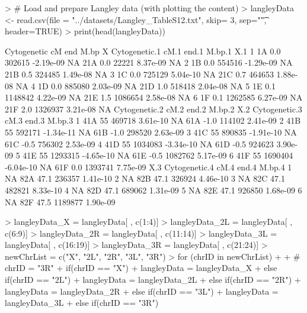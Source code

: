 \documentclass{article}
\begin{document}
\begin{Schunk}
\begin{Sinput}
> # Load and prepare Langley data (with plotting the content)
> langleyData <- read.csv(file = "../datasets/Langley_TableS12.txt", skip= 3, sep="\t", header=TRUE)
>     print(head(langleyData))
\end{Sinput}
\begin{Soutput}
  Cytogenetic  cM     end      M.bp  X Cytogenetic.1 cM.1   end.1   M.bp.1 X.1
1          1A 0.0  302615 -2.19e-09 NA           21A  0.0   22221 8.37e-09  NA
2          1B 0.0  554516 -1.29e-09 NA           21B  0.5  324485 1.49e-08  NA
3          1C 0.0  725129  5.04e-10 NA           21C  0.7  464653 1.88e-08  NA
4          1D 0.0  885080  2.03e-09 NA           21D  1.0  518418 2.04e-08  NA
5          1E 0.1 1148842  4.22e-09 NA           21E  1.5 1086654 2.58e-08  NA
6          1F 0.1 1262585  6.27e-09 NA           21F  2.0 1326937 3.21e-08  NA
  Cytogenetic.2 cM.2   end.2    M.bp.2 X.2 Cytogenetic.3 cM.3   end.3   M.bp.3
1           41A   55  469718  3.61e-10  NA           61A -1.0  114102 2.41e-09
2           41B   55  592171 -1.34e-11  NA           61B -1.0  298520 2.63e-09
3           41C   55  890835 -1.91e-10  NA           61C -0.5  756302 2.53e-09
4           41D   55 1034083 -3.34e-10  NA           61D -0.5  924623 3.90e-09
5           41E   55 1293315 -4.65e-10  NA           61E -0.5 1082762 5.17e-09
6           41F   55 1690404 -6.04e-10  NA           61F  0.0 1393741 7.75e-09
  X.3 Cytogenetic.4 cM.4   end.4   M.bp.4
1  NA           82A 47.1  236357 1.41e-10
2  NA           82B 47.1  326924 4.46e-10
3  NA           82C 47.1  482821 8.33e-10
4  NA           82D 47.1  689062 1.31e-09
5  NA           82E 47.1  926850 1.68e-09
6  NA           82F 47.5 1189877 1.90e-09
\end{Soutput}
\begin{Sinput}
>     langleyData_X = langleyData[ , c(1:4)]
>     langleyData_2L = langleyData[ , c(6:9)]
>     langleyData_2R = langleyData[ , c(11:14)]
>     langleyData_3L = langleyData[ , c(16:19)]
>     langleyData_3R = langleyData[ , c(21:24)]
>     newChrList = c("X", "2L", "2R", "3L", "3R")
>     for (chrID in newChrList) {
+ 
+         # chrID = "3R"
+         if(chrID == "X"){
+             langleyData = langleyData_X
+         }else if(chrID == "2L"){
+             langleyData = langleyData_2L
+         }else if(chrID == "2R"){
+             langleyData = langleyData_2R
+         }else if(chrID == "3L"){
+             langleyData = langleyData_3L
+         }else if(chrID == "3R"){
}}
\end{Sinput}
\end{Schunk}
\end{document}
